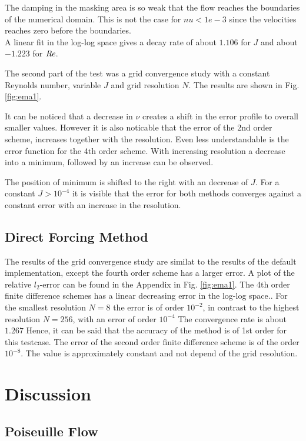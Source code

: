 The damping in the masking area is so weak that the flow reaches the  boundaries of the numerical domain.
This is not the case for $nu<1e-3$ since the velocities reaches zero before the boundaries.\\
A linear fit in the log-log space gives a  decay rate of about $1.106$ for  $J$ and about $-1.223$ for $\mbox{\textit{Re}}$.

The second part of the test was a grid convergence study with a constant Reynolds number, variable $J$ and grid resolution $N$.
The results are shown in Fig. \ref{fig:ema1}.

It can be noticed that a decrease in $\nu$ creates a shift in the error profile to overall smaller values.
However it is also noticable that the error of the 2nd order scheme, increases together with the resolution.
Even less understandable is the error function for the 4th order scheme.
With increasing resolution  a decrease into a minimum, followed by an increase can be observed.

The position of minimum is shifted to the right with an decrease of $J$.
For a constant $J>10^{-4}$ it is visible that the error for both methods converges against a
constant error  with an increase in the resolution.

\subsection{Direct Forcing Method}

The results of the grid convergence study are similat to the results of the default implementation,
except the fourth order scheme has a larger error.
A plot of the relative $l_2$-error can be found in the Appendix  in Fig. \ref{fig:ema1}.
The 4th order finite difference schemes has a linear decreasing error in the log-log space..
For the smallest resolution $N=8$ the error is of order $10^{-2}$,
in contrast to the highest resolution $N=256$, with an error of order $10^{-4}$
The convergence rate is about $1.267$
Hence, it can be said that the accuracy of the method is of 1st order for this testcase.
The error of the second order finite difference scheme is of the order $10^{-8}$.
The value is approximately constant and not depend of the grid resolution.

\clearpage

\section{Discussion}
\subsection{Poiseuille Flow}
